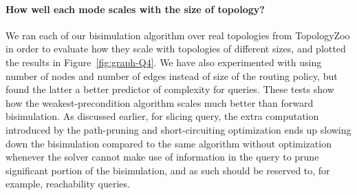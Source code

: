 \paragraph{How well each mode scales with the size of topology?}

We ran each of our bisimulation algorithm over real topologies from TopologyZoo
in order to evaluate how they scale with topologies of different sizes, and plotted the results in
Figure~\ref{fig:graph-Q4}. We have also experimented with using number of nodes and number of edges instead of size of the routing policy, but found the latter a better predictor of complexity for queries. These tests show how the weakest-precondition algorithm
scales much better than forward bisimulation. As discussed earlier,
for slicing query, the extra computation introduced by the
path-pruning and short-circuiting optimization ends up slowing down
the bisimulation compared to the same algorithm without optimization whenever the solver cannot make use of information in the query to prune significant portion of the bisimulation, and as such should be reserved to, for example, reachability queries.

